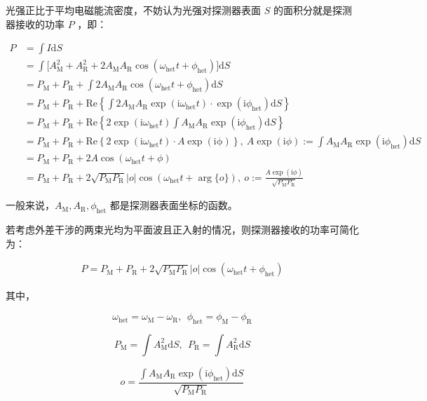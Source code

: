 \documentclass{beamer}
\begin{document}
\begin{frame}

光强正比于平均电磁能流密度，不妨认为光强对探测器表面 $S $ 的面积分就是探测器接收的功率 $P $ ，即：

$$
\begin{aligned}
P
&=\int I\mathrm{d}S \\
&=\int \bigg[ A_{\mathrm{M}}^2 + A_{\mathrm{R}}^2 + 2A_{\mathrm{M}}A_{\mathrm{R}}\cos(\omega_{\mathrm{het}}t+\phi_{\mathrm{het}}) \bigg] \mathrm{d}S \\
&=P_{\mathrm{M}} + P_{\mathrm{R}} + \int 2 A_{\mathrm{M}}A_{\mathrm{R}}\cos(\omega_{\mathrm{het}}t+\phi_{\mathrm{het}})\mathrm{d}S \\
&=P_{\mathrm{M}} + P_{\mathrm{R}} + \mathrm{Re} \left\{\int 2 A_{\mathrm{M}}A_{\mathrm{R}}\exp(\mathrm{i}\omega_{\mathrm{het}} t)\cdot\exp(\mathrm{i} \phi_{\mathrm{het}}) \mathrm{d}S \right\} \\
&=P_{\mathrm{M}} + P_{\mathrm{R}} + \mathrm{Re} \left\{2\exp(\mathrm{i} \omega_{\mathrm{het}}t) \int A_{\mathrm{M}}A_{\mathrm{R}} \exp(\mathrm{i} \phi_{\mathrm{het}}) \mathrm{d}S \right\} \\
&=P_{\mathrm{M}} + P_{\mathrm{R}} + \mathrm{Re}\left\{2\exp(\mathrm{i} \omega_{\mathrm{het}}t)\cdot A\exp(\mathrm{i\phi}) \right\},~A\exp(\mathrm{i}\phi):=\int A_{\mathrm{M}}A_{\mathrm{R}} \exp(\mathrm{i} \phi_{\mathrm{het}}) \mathrm{d}S \\
&=P_{\mathrm{M}} + P_{\mathrm{R}} + 2A\cos(\omega_{\mathrm{het}}t + \phi) \\
&=P_{\mathrm{M}} + P_{\mathrm{R}} + 2\sqrt{P_{\mathrm{M}}P_{\mathrm{R}}}|o|\cos(\omega_{\mathrm{het}}t+\arg\{o \}),~o:=\frac{A\exp(\mathrm{i}\phi)}{\sqrt{P_{\mathrm{M}}P_{\mathrm{R}}}}
\end{aligned}
$$

\end{frame}

\begin{frame}
    
    一般来说，$A_{\mathrm{M}},A_{\mathrm{R}},\phi_{\mathrm{het}}$ 都是探测器表面坐标的函数。

    若考虑外差干涉的两束光均为平面波且正入射的情况，则探测器接收的功率可简化为：

    $$
    \begin{aligned}
    P
    =P_{\mathrm{M}} + P_{\mathrm{R}} + 2\sqrt{P_{\mathrm{M}}P_{\mathrm{R}}}|o|\cos(\omega_{\mathrm{het}}t+\phi_{\mathrm{het}})
    \end{aligned}
    $$

    其中，
    
    $$
    \omega_{\mathrm{het}} = \omega_{\mathrm{M}}-\omega_{\mathrm{R}},~~
    \phi_{\mathrm{het}} = \phi_{\mathrm{M}}-\phi_{\mathrm{R}}
    $$

    $$
    P_{\mathrm{M}} = \int A_{\mathrm{M}}^2\mathrm{d}S,~~P_{\mathrm{R}}=\int A_{\mathrm{R}}^2 \mathrm{d}S 
    $$

    $$
    o = \frac{\int A_{\mathrm{M}}A_{\mathrm{R}} \exp(\mathrm{i} \phi_{\mathrm{het}}) \mathrm{d}S }{\sqrt{P_{\mathrm{M}}P_{\mathrm{R}}} } 
    $$

\end{frame}
\end{document}
